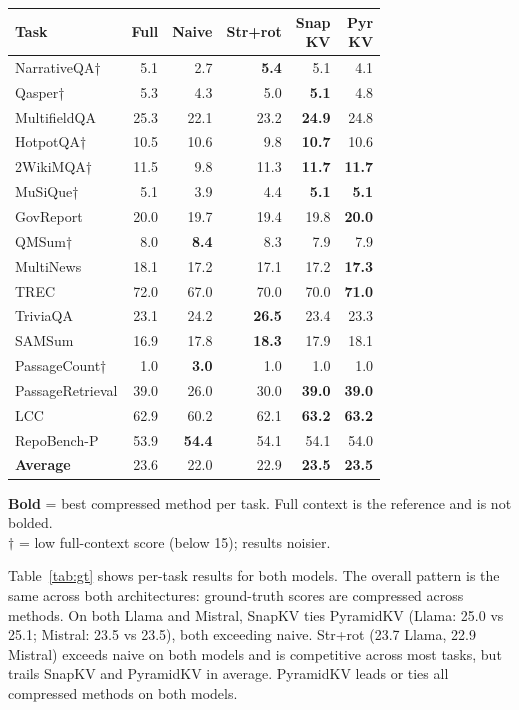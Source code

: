 \documentclass[10pt,letterpaper]{article}
\begin{document}
\begin{table}[H]
\begin{minipage}[t]{0.49\textwidth}
\begin{tabular}{@{}lrrrrr@{}}
\toprule
Task & Full & Naive & Str+rot & \makecell{Snap\\KV} & \makecell{Pyr\\KV}\\
\midrule
NarrativeQA† & 5.1 & 2.7 & \textbf{5.4} & 5.1 & 4.1\\
Qasper† & 5.3 & 4.3 & 5.0 & \textbf{5.1} & 4.8\\
MultifieldQA & 25.3 & 22.1 & 23.2 & \textbf{24.9} & 24.8\\
HotpotQA† & 10.5 & 10.6 & 9.8 & \textbf{10.7} & 10.6\\
2WikiMQA† & 11.5 & 9.8 & 11.3 & \textbf{11.7} & \textbf{11.7}\\
MuSiQue† & 5.1 & 3.9 & 4.4 & \textbf{5.1} & \textbf{5.1}\\
GovReport & 20.0 & 19.7 & 19.4 & 19.8 & \textbf{20.0}\\
QMSum† & 8.0 & \textbf{8.4} & 8.3 & 7.9 & 7.9\\
MultiNews & 18.1 & 17.2 & 17.1 & 17.2 & \textbf{17.3}\\
TREC & 72.0 & 67.0 & 70.0 & 70.0 & \textbf{71.0}\\
TriviaQA & 23.1 & 24.2 & \textbf{26.5} & 23.4 & 23.3\\
SAMSum & 16.9 & 17.8 & \textbf{18.3} & 17.9 & 18.1\\
PassageCount† & 1.0 & \textbf{3.0} & 1.0 & 1.0 & 1.0\\
PassageRetrieval & 39.0 & 26.0 & 30.0 & \textbf{39.0} & \textbf{39.0}\\
LCC & 62.9 & 60.2 & 62.1 & \textbf{63.2} & \textbf{63.2}\\
RepoBench-P & 53.9 & \textbf{54.4} & 54.1 & 54.1 & 54.0\\
\midrule
\textbf{Average} & 23.6 & 22.0 & 22.9 & \textbf{23.5} & \textbf{23.5}\\
\bottomrule
\end{tabular}
\end{minipage}
\par\smallskip
\textbf{Bold} = best compressed method per task. Full context is the reference and is not bolded.\\ \(\dagger\) = low full-context score (below 15); results noisier.
\end{table}

Table~\ref{tab:gt} shows per-task results for both models. The overall pattern is the same across both architectures: ground-truth
scores are compressed across methods. On both Llama and Mistral, SnapKV
ties PyramidKV (Llama: 25.0 vs 25.1; Mistral: 23.5 vs 23.5), both
exceeding naive. Str+rot (23.7 Llama, 22.9 Mistral) exceeds naive on
both models and is competitive across most tasks, but trails SnapKV and
PyramidKV in average. PyramidKV leads or ties all compressed methods on
both models.
\end{document}
